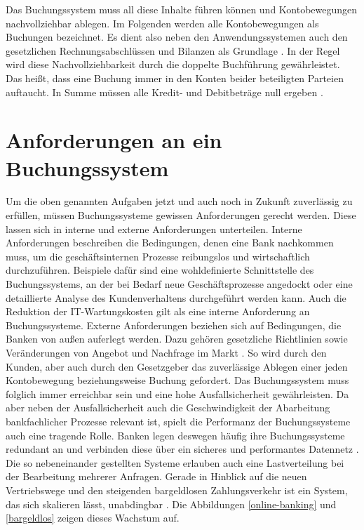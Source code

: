 \documentclass[12pt,oneside,a4paper,parskip]{scrbook}
\begin{document}
Das Buchungssystem muss all diese Inhalte führen können und Kontobewegungen nachvollziehbar ablegen. Im Folgenden werden alle Kontobewegungen als Buchungen bezeichnet. Es dient also neben den Anwendungssystemen auch den gesetzlichen Rechnungsabschlüssen und Bilanzen als Grundlage \cite{bankEnzy}\cite{MarkstudieKernbankensysteme}. In der Regel wird diese Nachvollziehbarkeit durch die doppelte Buchführung gewährleistet. Das heißt, dass eine Buchung immer in den Konten beider beteiligten Parteien auftaucht. In Summe müssen alle Kredit- und Debitbeträge null ergeben \cite{accounting}.

\section{Anforderungen an ein Buchungssystem}
Um die oben genannten Aufgaben jetzt und auch noch in Zukunft zuverlässig zu erfüllen, müssen Buchungssysteme gewissen Anforderungen gerecht werden. Diese lassen sich in interne und externe Anforderungen unterteilen. Interne Anforderungen beschreiben die Bedingungen, denen eine Bank nachkommen muss, um die geschäftsinternen Prozesse reibungslos und wirtschaftlich durchzuführen. Beispiele dafür sind eine wohldefinierte Schnittstelle des Buchungssystems, an der bei Bedarf neue Geschäftsprozesse angedockt oder eine detaillierte Analyse des Kundenverhaltens durchgeführt werden kann. Auch die Reduktion der IT-Wartungskosten gilt als eine interne Anforderung an Buchungssysteme. Externe Anforderungen beziehen sich auf Bedingungen, die Banken von außen auferlegt werden. Dazu gehören gesetzliche Richtlinien sowie Veränderungen von Angebot und Nachfrage im Markt \cite{capgemini}. So wird durch den Kunden, aber auch durch den Gesetzgeber das zuverlässige Ablegen einer jeden Kontobewegung beziehungsweise Buchung gefordert. Das Buchungssystem muss folglich immer erreichbar sein und eine hohe Ausfallsicherheit gewährleisten. Da aber neben der Ausfallsicherheit auch die Geschwindigkeit der Abarbeitung bankfachlicher Prozesse relevant ist, spielt die Performanz der Buchungssysteme auch eine tragende Rolle. Banken legen deswegen häufig ihre Buchungssysteme redundant an und verbinden diese über ein sicheres und performantes Datennetz \cite{bankEnzy}\cite[97-99]{ITidF}. Die so nebeneinander gestellten Systeme erlauben auch eine Lastverteilung bei der Bearbeitung mehrerer Anfragen. Gerade in Hinblick auf die neuen Vertriebswege und den steigenden bargeldlosen Zahlungsverkehr ist ein System, das sich skalieren lässt, unabdingbar \cite{bankEnzy}\cite{capgemini}. Die Abbildungen \ref{online-banking} und \ref{bargeldlos} zeigen dieses Wachstum auf.
\end{document}
